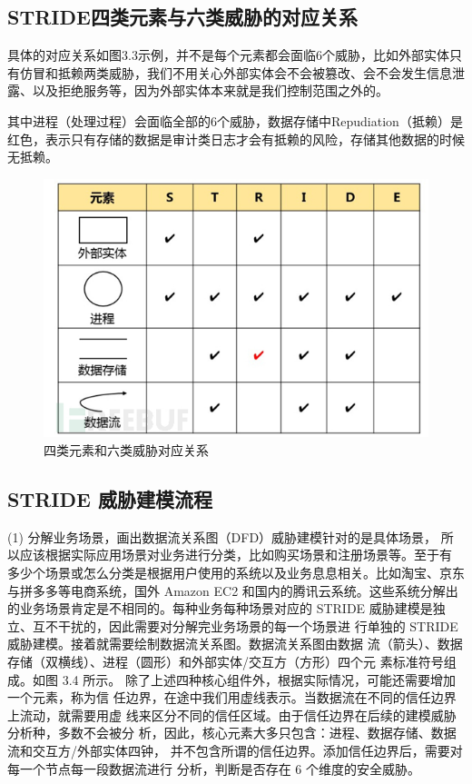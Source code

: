 \subsection[]{STRIDE四类元素与六类威胁的对应关系}

具体的对应关系如图3.3示例，并不是每个元素都会面临6个威胁，比如外部实体只有仿冒和抵赖两类威胁，我们不用关心外部实体会不会被篡改、会不会发生信息泄露、以及拒绝服务等，因为外部实体本来就是我们控制范围之外的。

其中进程（处理过程）会面临全部的6个威胁，数据存储中Repudiation（抵赖）是红色，表示只有存储的数据是审计类日志才会有抵赖的风险，存储其他数据的时候无抵赖。
\begin{figure}
    \centering
    \includegraphics[scale=0.6]{resources/img/i6.png}
    \caption{四类元素和六类威胁对应关系}
  \end{figure}

\subsection[]{STRIDE 威胁建模流程}
(1) 分解业务场景，画出数据流关系图（DFD）威胁建模针对的是具体场景，
所以应该根据实际应用场景对业务进行分类，比如购买场景和注册场景等。至于有
多少个场景或怎么分类是根据用户使用的系统以及业务息息相关。比如淘宝、京东
与拼多多等电商系统，国外 Amazon EC2 和国内的腾讯云系统。这些系统分解出的业务场景肯定是不相同的。每种业务每种场景对应的
STRIDE 威胁建模是独立、互不干扰的，因此需要对分解完业务场景的每一个场景进
行单独的 STRIDE 威胁建模。接着就需要绘制数据流关系图。数据流关系图由数据
流（箭头）、数据存储（双横线）、进程（圆形）和外部实体/交互方（方形）四个元
素标准符号组成。如图 3.4 所示。
除了上述四种核心组件外，根据实际情况，可能还需要增加一个元素，称为信
任边界，在途中我们用虚线表示。当数据流在不同的信任边界上流动，就需要用虚
线来区分不同的信任区域。由于信任边界在后续的建模威胁分析种，多数不会被分
析，因此，核心元素大多只包含：进程、数据存储、数据流和交互方/外部实体四钟，
并不包含所谓的信任边界。添加信任边界后，需要对每一个节点每一段数据流进行
分析，判断是否存在 6 个维度的安全威胁。

